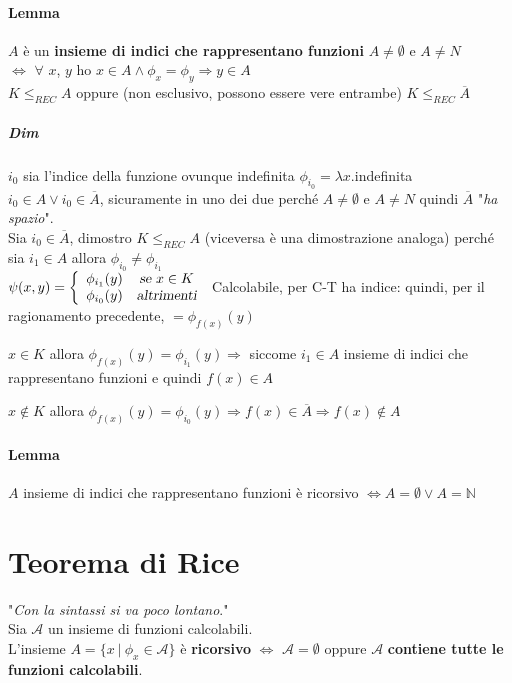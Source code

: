 \documentclass[10pt]{book}
\begin{document}
\paragraph{Lemma} $A$ è un \textbf{insieme di indici che rappresentano funzioni} $A \neq \emptyset$ e $A \neq N$\\$\Leftrightarrow$ $\forall$ $x$, $y$ ho $x \in A \wedge \phi_x = \phi_y \Rightarrow y \in A$ \\
$K \leq_{REC} A$ oppure (non esclusivo, possono essere vere entrambe) $K \leq_{REC} \overline{A}$
\subparagraph{Dim} $i_0$ sia l'indice della funzione ovunque indefinita $\phi_{i_0} = \lambda x.$indefinita\\
$i_0 \in A \vee i_0 \in \overline{A}$, sicuramente in uno dei due perché $A \neq \emptyset$ e $A \neq N$ quindi $\overline{A}$ "\textit{ha spazio}".\\
Sia $i_0 \in \overline{A}$, dimostro $K \leq_{REC} A$ (viceversa è una dimostrazione analoga) perché sia $i_1 \in A$ allora $\phi_{i_0} \neq \phi_{i_1}$\\
$\psi(x, y) = \left\{
\begin{array}{l c}
\phi_{i_1}(y) & \textsl{se }x \in K\\
\phi_{i_0}(y) & \textsl{altrimenti}
\end{array}\right.$
Calcolabile, per C-T ha indice: quindi, per il ragionamento precedente, $= \phi_{f(x)}(y)$
\begin{list}{}{}
	\item $x \in K$ allora $\phi_{f(x)}(y)  = \phi_{i_1}(y) \Rightarrow$ siccome $i_1 \in A$ insieme di indici che rappresentano funzioni e quindi $f(x) \in A$
	\item $x \not\in K$ allora $\phi_{f(x)}(y)  = \phi_{i_0}(y) \Rightarrow f(x) \in \overline{A} \Rightarrow f(x) \not\in A$
\end{list}
\paragraph{Lemma} $A$ insieme di indici che rappresentano funzioni è ricorsivo $\Leftrightarrow A = \emptyset \vee A = \mathbb{N}$

\section{Teorema di Rice}
"\textit{Con la sintassi si va poco lontano}."\\ %
Sia $\mathscr{A}$ un insieme di funzioni calcolabili.\\
L'insieme $A = \{x \:|\: \phi_x \in \mathscr{A}\}$ è \textbf{ricorsivo} $\Leftrightarrow$ $\mathscr{A} = \emptyset$ oppure $\mathscr{A}$ \textbf{contiene tutte le funzioni calcolabili}.
\end{document}
